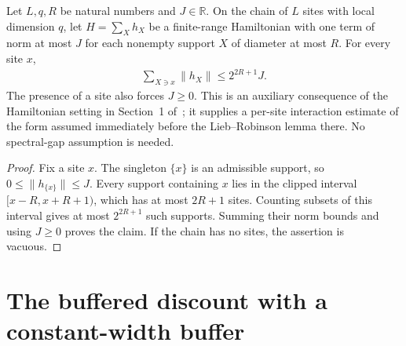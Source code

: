 \begin{lemma}
    \label{lem:chain_site_norm_budget}
    \leanok
    Let $L,q,R$ be natural numbers and $J\in\mathbb R$. On the chain of $L$
    sites with local dimension $q$, let $H=\sum_X h_X$ be a finite-range
    Hamiltonian with one term of norm at most $J$ for each nonempty support
    $X$ of diameter at most $R$. For every site $x$,
    \begin{align}
        \sum_{X\ni x}\lVert h_X\rVert\le 2^{2R+1}J.
    \end{align}
    The presence of a site also forces $J\ge0$.
    This is an auxiliary consequence of the Hamiltonian setting
    in Section~1 of~\cite{TNLean2026OneDimensional}; it supplies a
    per-site interaction estimate of the form assumed immediately before
    the Lieb--Robinson lemma there. No spectral-gap assumption is needed.
\end{lemma}
\begin{proof}
    \leanok
    Fix a site $x$. The singleton $\{x\}$ is an admissible support, so
    $0\le\lVert h_{\{x\}}\rVert\le J$. Every support containing $x$ lies in
    the clipped interval $[x-R,x+R+1)$, which has at most $2R+1$ sites.
    Counting subsets of this interval gives at most $2^{2R+1}$ such supports.
    Summing their norm bounds and using $J\ge0$ proves the claim. If the chain
    has no sites, the assertion is vacuous.
\end{proof}

\section{The buffered discount with a constant-width buffer}

